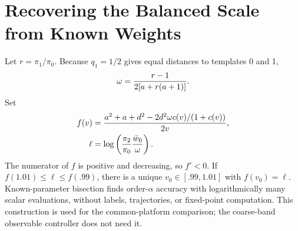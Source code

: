 \documentclass[10pt,twocolumn,letterpaper]{article}
\begin{document}
\section{Recovering the Balanced Scale from Known Weights}
Let $r=\pi_1/\pi_0$. Because $q_1=1/2$ gives equal distances to templates 0 and 1,
\begin{equation}
\omega={r-1\over2[a+r(a+1)]}.
\end{equation}
Set
\begin{align}
f(v)&={a^2+a+d^2-2d^2\omega c(v)/(1+c(v))\over2v},\\
\ell&=\log\left({\pi_2\over\pi_0}{\bar w_0\over\omega}\right).
\end{align}
The numerator of $f$ is positive and decreasing, so $f'<0$. If $f(1.01)\le\ell\le f(.99)$, there is a unique $v_0\in[.99,1.01]$ with $f(v_0)=\ell$. Known-parameter bisection finds order-$\alpha$ accuracy with logarithmically many scalar evaluations, without labels, trajectories, or fixed-point computation. This construction is used for the common-platform comparison; the coarse-band observable controller does not need it.
\end{document}
